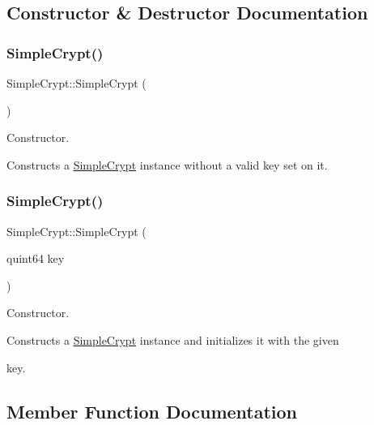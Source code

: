 \subsection{Constructor \& Destructor Documentation}
\mbox{\label{class_simple_crypt_ac474d12cfa9f93bfecea35891831046d}} 
\subsubsection{\texorpdfstring{SimpleCrypt()}{SimpleCrypt()}\hspace{0.1cm}{\footnotesize\ttfamily [1/2]}}
{\footnotesize\ttfamily Simple\+Crypt\+::\+Simple\+Crypt (\begin{DoxyParamCaption}{ }\end{DoxyParamCaption})}

Constructor.

Constructs a \mbox{\hyperlink{class_simple_crypt}{Simple\+Crypt}} instance without a valid key set on it. \mbox{\label{class_simple_crypt_a65942757b85b3dd36618ea3edc5ceb89}} 
\subsubsection{\texorpdfstring{SimpleCrypt()}{SimpleCrypt()}\hspace{0.1cm}{\footnotesize\ttfamily [2/2]}}
{\footnotesize\ttfamily Simple\+Crypt\+::\+Simple\+Crypt (\begin{DoxyParamCaption}\item[{quint64}]{key }\end{DoxyParamCaption})\hspace{0.3cm}{\ttfamily [explicit]}}

Constructor.

Constructs a \mbox{\hyperlink{class_simple_crypt}{Simple\+Crypt}} instance and initializes it with the given \begin{DoxyItemize}
\item key. \end{DoxyItemize}


\subsection{Member Function Documentation}
\mbox{\label{class_simple_crypt_ac0a68b3ef5441aaf7724f11376e036bd}} 
